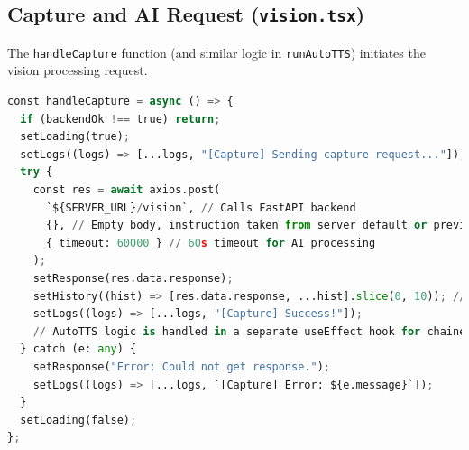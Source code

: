 \documentclass[12pt, a4paper]{report}
\begin{document}
\subsection{Capture and AI Request (\texttt{vision.tsx})}
The \texttt{handleCapture} function (and similar logic in \texttt{runAutoTTS}) initiates the vision processing request.
\begin{lstlisting}[language=Python, caption={React Native Capture Handler Snippet from vision.tsx}, label={lst:rn_capture_ch4}] % Changed label, lang
const handleCapture = async () => {
  if (backendOk !== true) return;
  setLoading(true);
  setLogs((logs) => [...logs, "[Capture] Sending capture request..."]);
  try {
    const res = await axios.post(
      `${SERVER_URL}/vision`, // Calls FastAPI backend
      {}, // Empty body, instruction taken from server default or previous config
      { timeout: 60000 } // 60s timeout for AI processing
    );
    setResponse(res.data.response);
    setHistory((hist) => [res.data.response, ...hist].slice(0, 10)); // Keep history to 10
    setLogs((logs) => [...logs, "[Capture] Success!"]);
    // AutoTTS logic is handled in a separate useEffect hook for chained requests
  } catch (e: any) {
    setResponse("Error: Could not get response.");
    setLogs((logs) => [...logs, `[Capture] Error: ${e.message}`]);
  }
  setLoading(false);
};
\end{lstlisting}
\end{document}
